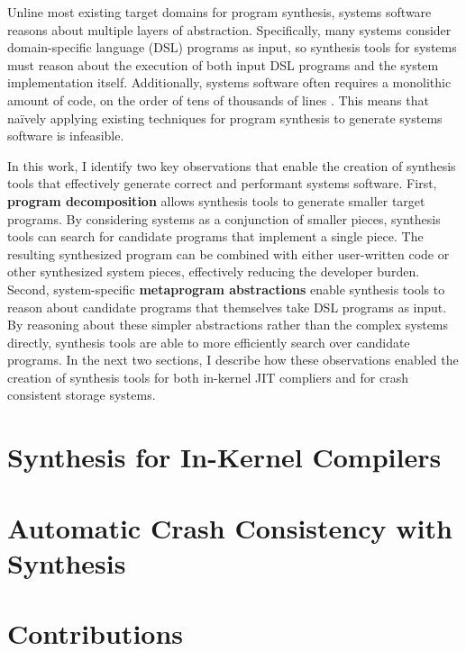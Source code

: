 Unline most existing target domains for program synthesis, systems software reasons
about multiple layers of abstraction.
Specifically, many systems consider domain-specific language (DSL) programs as input,
so synthesis tools for systems must reason about the execution of both input DSL programs
and the system implementation itself.
Additionally, systems software
often requires a monolithic amount of code, on the order of tens of thousands
of lines .
This means that na\"ively applying existing techniques for program synthesis to generate
systems software is infeasible.

In this work, I identify two key observations that enable the creation of synthesis tools
that effectively generate correct and performant systems software.
First, \textbf{program decomposition} allows synthesis tools to generate smaller target programs.
By considering systems as a conjunction of smaller pieces,
synthesis tools can search for candidate programs that implement a single piece.
The resulting synthesized program can be combined with either user-written code or
other synthesized system pieces, effectively reducing the developer burden.
Second, system-specific \textbf{metaprogram abstractions} enable synthesis tools to reason 
about candidate programs that themselves take DSL programs as input.
By reasoning about these simpler abstractions rather than the complex systems directly,
synthesis tools are able to more efficiently search over candidate programs.
In the next two sections, I describe how these observations enabled the creation of
synthesis tools for both in-kernel JIT compliers and for crash consistent storage systems.



\section{Synthesis for In-Kernel Compilers}

\section{Automatic Crash Consistency with Synthesis}

\section{Contributions}

